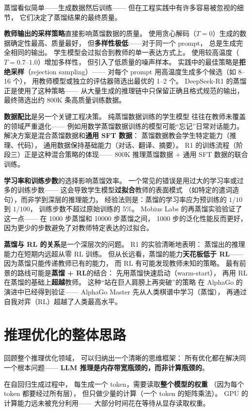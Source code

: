 蒸馏看似简单——生成数据然后训练——
但在工程实践中有许多容易被忽视的细节，
它们决定了蒸馏结果的最终质量。

\textbf{教师输出的采样策略}直接影响蒸馏数据的质量。
使用贪心解码（$T = 0$）生成的数据确定性最高、质量最好，
但\textbf{多样性极低}——对于同一个 prompt，
总是生成完全相同的输出。
学生模型会过拟合到教师的单一表达方式上。
使用较高温度（$T = 0.7$--$1.0$）增加多样性，
但引入了低质量的噪声样本。
实践中的最佳策略是\textbf{拒绝采样}（rejection sampling）——
对每个 prompt 用高温度生成多个候选（如 8--16 个），
用教师模型或独立的评估器筛选出最优的 1--2 个。
DeepSeek-R1 的蒸馏正是使用了这种策略——
从大量生成的推理链中只保留正确且格式规范的输出，
最终筛选出约 800K 条高质量训练数据。

\textbf{数据配比}是另一个关键工程决策。
纯蒸馏数据训练的学生模型
往往在教师未覆盖的领域严重退化——
例如用数学蒸馏数据训练的模型可能“忘记”日常对话能力。
解决方案是混合蒸馏数据和\textbf{通用 SFT 数据}：
蒸馏数据教会学生特定能力（推理、代码），
通用数据保持基础能力（对话、翻译、摘要）。
R1 的训练流程（阶段三）正是这种混合策略的体现——
800K 推理蒸馏数据 + 通用 SFT 数据的联合训练。

\textbf{学习率和训练步数}的选择影响蒸馏效率。
一个常见的错误是用过大的学习率或过多的训练步数——
这会导致学生模型\textbf{过拟合}教师的表面模式
（如特定的遣词造句），而非学到深层的推理能力。
经验法则是：蒸馏的学习率应为预训练的 $1/10$ 到 $1/100$，
训练步数不超过原始训练的 5\%。
Mobius Labs 的再蒸馏实验验证了这一点——
在 1000 步蒸馏和 10000 步蒸馏之间，
1000 步的泛化性能反而更好，
因为更少的步数避免了对教师特定表达的过拟合。

\textbf{蒸馏与 RL 的关系}是一个深层次的问题。
R1 的实验清晰地表明：
蒸馏出的推理能力在短期内远超从零 RL 训练。
但从长远看，蒸馏的能力\textbf{天花板低于 RL}——
因为蒸馏只能传递教师已有的能力，
而 RL 有可能发现教师未知的策略。
最有前景的路线可能是\textbf{蒸馏 + RL}的结合：
先用蒸馏快速启动（warm-start），
再用 RL 在蒸馏的基础上\textbf{超越}教师。
这种“站在巨人肩膀上再突破”的策略
在 AlphaGo 的演进中已经得到验证——
AlphaGo Master 先从人类棋谱中学习（蒸馏），
再通过自我对弈（RL）超越了人类最高水平。


\section{推理优化的整体思路}

回顾整个推理优化领域，
可以归纳出一个清晰的思维框架：
所有优化都在解决同一个根本问题——
\textbf{LLM 推理是内存带宽瓶颈的，而非计算瓶颈的}。

在自回归生成过程中，
每生成一个 token，需要读取\textbf{整个模型的权重}
（因为每个 token 都要经过所有层），
但只做少量的计算（一个 token 的矩阵乘法）。
GPU 的计算能力远未被充分利用——
大部分时间花在等待从显存读取权重。

